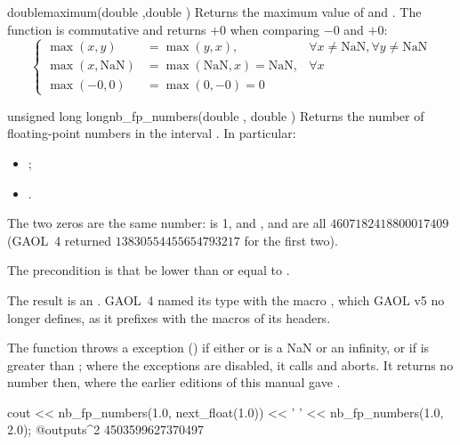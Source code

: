 \begin{deffun}{double}{maximum}{(double ,double )}
  Returns the maximum  value of  and . The
  function is commutative and returns $+0$ when comparing $-0$ and $+0$:
\begin{equation*}
\left\{\begin{array}{lll}
  \max(x,y) &= \max(y,x), &\forall x\neq\text{NaN}, \forall y\neq\text{NaN} \\
  \max(x,\text{NaN})&=\max(\text{NaN},x)=\text{NaN}, &\forall x\\
  \max(-0,0)&=\max(0,-0)=0
\end{array}\right.
\end{equation*}
\end{deffun}

\begin{deffun}{unsigned long long}{nb\_fp\_numbers}{(double , double )}
  Returns the number of floating-point numbers in the interval
  . In particular:
  \begin{itemize}
  \item {};
  \item {}.
  \end{itemize}
  The two zeros are the same number:  is 1,
  and ,  and
   are all $4607182418800017409$ (GAOL~4
  returned $13830554455654793217$ for the first two).\newinvfive

  The precondition is that  be lower than or equal to .

  The result is an . GAOL~4 named its type with the
  macro , which GAOL v5 no longer defines, as it prefixes
  with  the macros of its headers.\newinvfive

  The function throws a  exception
  () if either  or  is a NaN or an
  infinity, or if  is greater than ; where the exceptions are
  disabled, it calls  and aborts. It returns no number
  then, where the earlier editions of this manual gave
  .\newinvfive
\begin{example}
cout << nb_fp_numbers(1.0, next_float(1.0)) << ' '
     << nb_fp_numbers(1.0, 2.0);
@outputs^2 4503599627370497~
\end{example}
\end{deffun}

